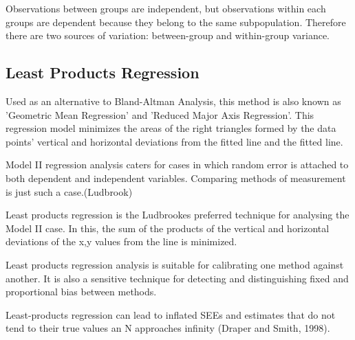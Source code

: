 \documentclass[12pt, a4paper]{report}
\theoremstyle{plain}
\theoremstyle{definition}
\theoremstyle{remark}
\begin{document}
	Observations between groups are independent, but observations
	within each groups are dependent because they belong to the same
	subpopulation. Therefore there are two sources of variation:
	between-group and within-group variance.
	
	
	
	
	\subsection{Least Products Regression}
	Used as an alternative to Bland-Altman Analysis, this method is also known as 'Geometric Mean Regression' and 'Reduced Major Axis Regression'. This regression model minimizes the areas of the right triangles formed by the data points' vertical and horizontal deviations from the fitted line and the fitted line.
	
	Model II regression analysis caters for cases in which random error is attached to both dependent and independent variables. Comparing methods of measurement is just such a case.(Ludbrook)
	
	Least products regression is the Ludbrookes preferred technique for analysing the Model II case. In this, the sum of the products of the vertical and horizontal deviations of the x,y values from the line is minimized.
	
	Least products regression analysis is suitable for calibrating one method against another. It is also a sensitive technique for detecting and distinguishing fixed and proportional bias between
	methods.
	
	Least-products regression can lead to inflated SEEs and estimates that do not tend to their true values an N approaches infinity (Draper and Smith, 1998).
	
	
	
	
	
\end{document}
